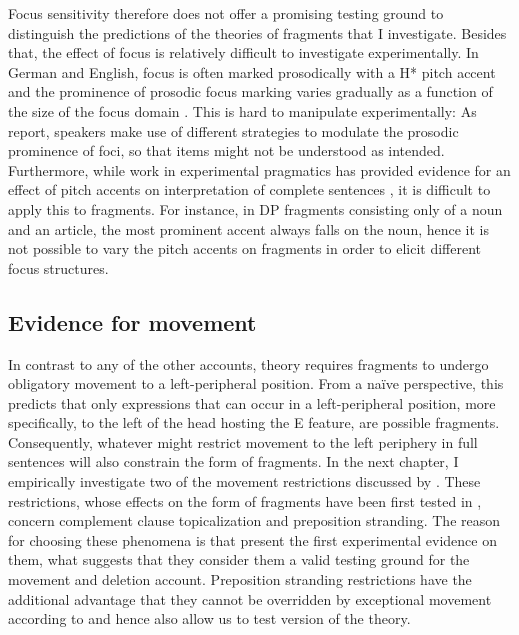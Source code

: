 Focus sensitivity therefore does not offer a promising testing ground to distinguish the predictions of the theories of fragments that I investigate. Besides that, the effect of focus is relatively difficult to investigate experimentally. In German and English, focus is often marked prosodically with a H* pitch accent \citep{gussenhoven1983, pierrehumbert.hirschberg1990} and the prominence of prosodic focus marking varies gradually as a function of the size of the focus domain \citet{baumann.etal2006, baumann.etal2007}. This is hard to manipulate experimentally: As \citet{baumann.etal2007} report, speakers make use of different strategies to modulate the prosodic prominence of foci, so that items might not be understood as intended. Furthermore, while work in experimental pragmatics has provided evidence for an effect of pitch accents on interpretation of complete sentences \citep[see e.g.][]{chevallier.etal2008, zondervan2010}, it is difficult to apply this to fragments. For instance, in DP fragments consisting only of a noun and an article, the most prominent accent always falls on the noun, hence it is not possible to vary the pitch accents on fragments in order to elicit different focus structures.


\subsection{Evidence for movement}
\label{sec:theories-predictions-movement}

In contrast to any of the other accounts,  theory requires fragments to undergo obligatory movement to a left-peripheral position. From a na\"{i}ve perspective, this predicts that only expressions that can occur in a left-peripheral position, more specifically, to the left of the head hosting the E feature, are possible fragments. Consequently, whatever might restrict movement to the left periphery in full sentences will also constrain the form of fragments. In the next chapter, I empirically investigate two of the movement restrictions discussed by \citet{merchant2004}. These restrictions, whose effects on the form of fragments have been first tested in \citet{merchant.etal2013}, concern complement clause topicalization and preposition stranding. The reason for choosing these phenomena is that \citet{merchant.etal2013} present the first experimental evidence on them, what suggests that they consider them a valid testing ground for the movement and deletion account. Preposition stranding restrictions have the additional advantage that they cannot be overridden by exceptional movement according to \citet{weir2015} and hence also allow us to test  version of the theory.

